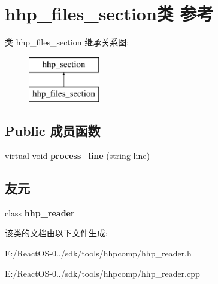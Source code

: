 \hypertarget{classhhp__files__section}{}\section{hhp\+\_\+files\+\_\+section类 参考}
\label{classhhp__files__section}
类 hhp\+\_\+files\+\_\+section 继承关系图\+:\begin{figure}[H]
\begin{center}
\leavevmode
\includegraphics[height=2.000000cm]{classhhp__files__section}
\end{center}
\end{figure}
\subsection*{Public 成员函数}
\begin{DoxyCompactItemize}
\item 
\mbox{\label{classhhp__files__section_a89d056ca09557b6c25deed41e003d3e3}} 
virtual \hyperlink{interfacevoid}{void} {\bfseries process\+\_\+line} (\hyperlink{structstring}{string} \hyperlink{structline}{line})
\end{DoxyCompactItemize}
\subsection*{友元}
\begin{DoxyCompactItemize}
\item 
\mbox{\label{classhhp__files__section_aa7b5f80bf368d4c70c7b78a5e7f61945}} 
class {\bfseries hhp\+\_\+reader}
\end{DoxyCompactItemize}


该类的文档由以下文件生成\+:\begin{DoxyCompactItemize}
\item 
E\+:/\+React\+O\+S-\/0../sdk/tools/hhpcomp/hhp\+\_\+reader.\+h\item 
E\+:/\+React\+O\+S-\/0../sdk/tools/hhpcomp/hhp\+\_\+reader.\+cpp\end{DoxyCompactItemize}
